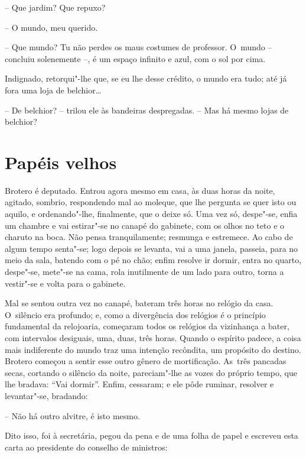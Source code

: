 -- Que jardim? Que repuxo?

-- O mundo, meu querido.

-- Que mundo? Tu não perdes os maus costumes de professor. O~mundo --
concluiu solenemente --, é um espaço infinito e azul, com o sol por
cima.

Indignado, retorqui"-lhe que, se eu lhe desse crédito, o mundo era tudo;
até já fora uma loja de belchior\ldots{}

-- De belchior? -- trilou ele às bandeiras despregadas. -- Mas há mesmo
lojas de belchior?

\chapter{Papéis velhos}

Brotero é deputado. Entrou agora mesmo em casa, às duas horas da noite,
agitado, sombrio, respondendo mal ao moleque, que lhe pergunta se quer
isto ou aquilo, e ordenando"-lhe, finalmente, que o deixe só. Uma vez só,
despe"-se, enfia um chambre e vai estirar"-se no canapé do gabinete, com
os olhos no teto e o charuto na boca. Não pensa tranquilamente; resmunga
e estremece. Ao cabo de algum tempo senta"-se; logo depois se levanta,
vai a uma janela, passeia, para no meio da sala, batendo com o pé no
chão; enfim resolve ir dormir, entra no quarto, despe"-se, mete"-se na
cama, rola inutilmente de um lado para outro, torna a vestir"-se e volta
para o gabinete.

Mal se sentou outra vez no canapé, bateram três horas no relógio da
casa. O~silêncio era profundo; e, como a divergência dos relógios é o
princípio fundamental da relojoaria, começaram todos os relógios da
vizinhança a bater, com intervalos desiguais, uma, duas, três horas.
Quando o espírito padece, a coisa mais indiferente do mundo traz uma
intenção recôndita, um propósito do destino. Brotero começou a sentir
esse outro gênero de mortificação. As~três pancadas secas, cortando o
silêncio da noite, pareciam"-lhe as vozes do próprio tempo, que lhe
bradava: ``Vai dormir''. Enfim, cessaram; e ele pôde ruminar, resolver e
levantar"-se, bradando:

-- Não há outro alvitre, é isto mesmo.

Dito isso, foi à secretária, pegou da pena e de uma folha de papel e
escreveu esta carta ao presidente do conselho de ministros:

